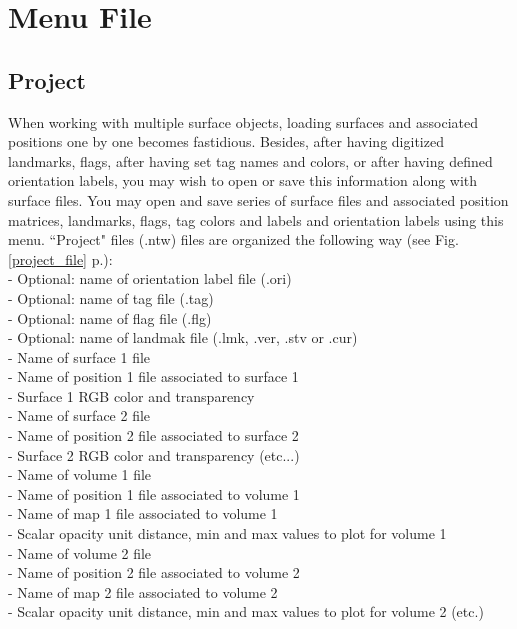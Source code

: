 \chapter{Menu File}
\minitoc  


\section{Project}
When working with multiple surface objects, loading surfaces and associated positions one by one becomes fastidious. Besides, after having digitized landmarks, flags, after having set tag names and colors, or after having defined orientation labels, you may wish to open or save this information along with surface files. You may open and save series of surface files and associated position matrices, landmarks, flags, tag colors and labels and orientation labels using this menu. ``Project" files (.ntw) files are organized the following way (see Fig. \ref{project_file} p.\pageref{project_file}):\\
- Optional: name of orientation label file (.ori)\\
- Optional: name of tag file (.tag)\\
- Optional: name of flag file (.flg)\\
- Optional: name of landmak file (.lmk, .ver, .stv or .cur)\\
- Name of surface 1 file\\
- Name of position 1 file associated to surface 1\\
- Surface 1 RGB color and transparency\\
- Name of surface 2 file\\
- Name of position 2 file associated to surface 2\\
- Surface 2 RGB color and transparency (etc...)\\
- Name of volume 1 file\\
- Name of position 1 file associated to volume 1\\
- Name of map 1 file associated to volume 1\\
- Scalar opacity unit distance, min and max values to plot for volume 1\\
- Name of volume 2 file\\
- Name of position 2 file associated to volume 2\\
- Name of map 2 file associated to volume 2\\
- Scalar opacity unit distance, min and max values to plot for volume 2 (etc.)\\

